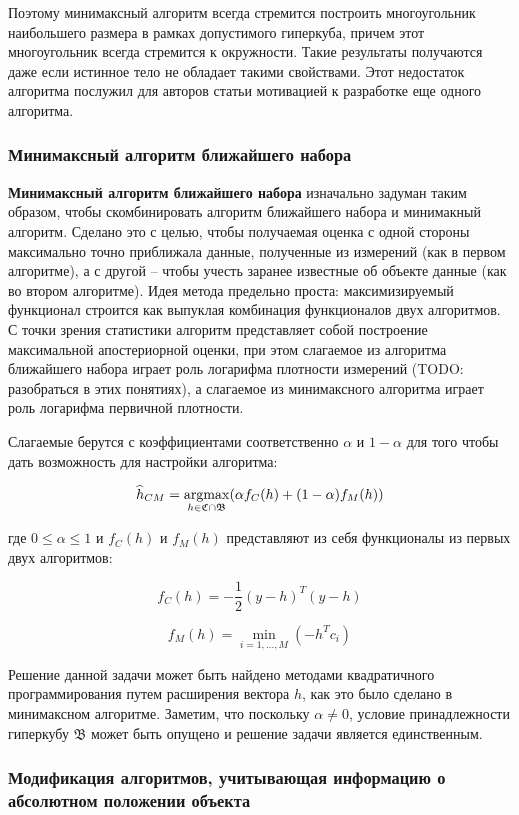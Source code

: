 \documentclass[a4paper,12pt, titlepage]{article}
\begin{document}
Поэтому минимаксный алгоритм всегда стремится построить многоугольник
наибольшего размера в рамках допустимого гиперкуба, причем этот многоугольник
всегда стремится к окружности. Такие результаты получаются даже если истинное
тело не обладает такими свойствами. Этот недостаток алгоритма послужил для
авторов статьи мотивацией к разработке еще одного алгоритма.

\subsubsection{Минимаксный алгоритм ближайшего набора}

\textbf{Минимаксный алгоритм ближайшего набора} изначально задуман таким
образом, чтобы скомбинировать алгоритм ближайшего набора и минимакный алгоритм.
Сделано это с целью, чтобы получаемая оценка с одной стороны максимально точно
приближала данные, полученные из измерений (как в первом алгоритме), а с другой
-- чтобы учесть заранее известные об объекте данные (как во втором алгоритме).
Идея метода предельно проста: максимизируемый функционал строится как выпуклая
комбинация функционалов двух алгоритмов. С точки зрения статистики алгоритм
представляет собой построение максимальной апостериорной оценки, при этом
слагаемое из алгоритма ближайшего набора играет роль логарифма плотности
измерений (TODO: разобраться в этих понятиях), а слагаемое из минимаксного
алгоритма играет роль логарифма первичной плотности.

Слагаемые берутся с коэффициентами соответственно $\alpha$ и $1 - \alpha$ для
того чтобы дать возможность для настройки алгоритма:

$$
\widehat{h}_{CM} =
\operatornamewithlimits{argmax}_{h \in \mathfrak{C} \cap \mathfrak{B}}
(\alpha f_{C}(h) + (1 - \alpha) f_{M}(h))
$$

где $0 \leq \alpha \leq 1$ и $f_{C}(h)$ и $f_{M}(h)$ представляют из себя
функционалы из первых двух алгоритмов:

$$
f_{C}(h) = - \frac{1}{2} (y - h)^{T} (y - h)
$$

$$
f_{M}(h) = \min_{i = 1, \ldots, M} (- h^{T} c_{i})
$$

Решение данной задачи может быть найдено методами квадратичного
программирования путем расширения вектора $h$, как это было сделано в
минимаксном алгоритме. Заметим, что поскольку $\alpha \neq 0$, условие
принадлежности гиперкубу $\mathfrak{B}$ может быть опущено и решение задачи
является единственным.

\subsubsection{Модификация алгоритмов, учитывающая информацию о абсолютном
положении объекта}
\end{document}
